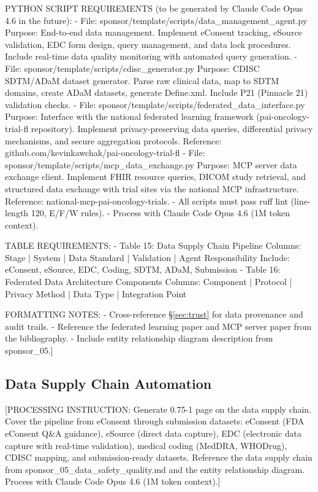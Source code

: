 PYTHON SCRIPT REQUIREMENTS (to be generated by Claude Code Opus 4.6 in the future):
- File: sponsor/template/scripts/data\_management\_agent.py
  Purpose: End-to-end data management. Implement eConsent tracking, eSource
  validation, EDC form design, query management, and data lock procedures.
  Include real-time data quality monitoring with automated query generation.
- File: sponsor/template/scripts/cdisc\_generator.py
  Purpose: CDISC SDTM/ADaM dataset generator. Parse raw clinical data,
  map to SDTM domains, create ADaM datasets, generate Define.xml. Include
  P21 (Pinnacle 21) validation checks.
- File: sponsor/template/scripts/federated\_data\_interface.py
  Purpose: Interface with the national federated learning framework
  (pai-oncology-trial-fl repository). Implement privacy-preserving data
  queries, differential privacy mechanisms, and secure aggregation protocols.
  Reference: github.com/kevinkawchak/pai-oncology-trial-fl
- File: sponsor/template/scripts/mcp\_data\_exchange.py
  Purpose: MCP server data exchange client. Implement FHIR resource queries,
  DICOM study retrieval, and structured data exchange with trial sites via
  the national MCP infrastructure. Reference: national-mcp-pai-oncology-trials.
- All scripts must pass ruff lint (line-length 120, E/F/W rules).
- Process with Claude Code Opus 4.6 (1M token context).

TABLE REQUIREMENTS:
- Table 15: Data Supply Chain Pipeline
  Columns: Stage | System | Data Standard | Validation | Agent Responsibility
  Include: eConsent, eSource, EDC, Coding, SDTM, ADaM, Submission
- Table 16: Federated Data Architecture Components
  Columns: Component | Protocol | Privacy Method | Data Type | Integration Point

FORMATTING NOTES:
- Cross-reference \S\ref{sec:trust} for data provenance and audit trails.
- Reference the federated learning paper and MCP server paper from the bibliography.
- Include entity relationship diagram description from sponsor\_05.]

\subsection{Data Supply Chain Automation}

[PROCESSING INSTRUCTION: Generate 0.75-1 page on the data supply chain. Cover the
pipeline from eConsent through submission datasets: eConsent (FDA eConsent Q\&A guidance),
eSource (direct data capture), EDC (electronic data capture with real-time validation),
medical coding (MedDRA, WHODrug), CDISC mapping, and submission-ready datasets.
Reference the data supply chain from sponsor\_05\_data\_safety\_quality.md and the entity
relationship diagram. Process with Claude Code Opus 4.6 (1M token context).]

